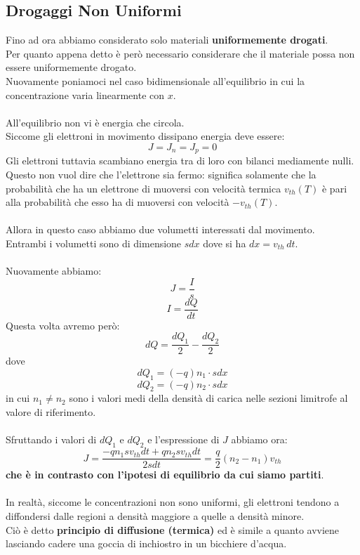 \documentclass{article}
\numberwithin{equation}{subsection}
\begin{document}
	\subsection{Drogaggi Non Uniformi}
	Fino ad ora abbiamo considerato solo materiali \textbf{uniformemente drogati}. \\
	Per quanto appena detto è però necessario considerare che il materiale possa non essere uniformemente drogato. \\
	Nuovamente poniamoci nel caso bidimensionale all’equilibrio in cui la concentrazione varia linearmente con $x$.\\\\
	All’equilibrio non vi è energia che circola. \\
	Siccome gli elettroni in movimento dissipano energia deve essere:
	$$J = J_n = J_p = 0$$
	Gli elettroni tuttavia scambiano energia tra di loro con bilanci mediamente nulli. \\
	Questo non vuol dire che l’elettrone sia fermo: significa solamente che la probabilità che ha un elettrone di muoversi con velocità termica $v_{th}(T)$ è pari alla probabilità che esso ha di muoversi con velocità $-v_{th}(T)$.\\\\
	Allora in questo caso abbiamo due volumetti interessati dal movimento. \\
	Entrambi i volumetti sono di dimensione $sdx$ dove si ha $dx = v_{th} \, dt$.\\\\
	Nuovamente abbiamo:
	$$J = \frac{I}{s}$$
	$$I = \frac{dQ}{dt}$$
	Questa volta avremo però:
	$$dQ = \frac{dQ_1}{2} - \frac{dQ_2}{2}$$
	dove
	$$dQ_1 = (-q) n_1 \cdot s dx$$
	$$dQ_2 = (-q) n_2 \cdot s dx$$
	in cui $n_1 \neq n_2$ sono i valori medi della densità di carica nelle sezioni limitrofe al valore di riferimento.\\\\
	Sfruttando i valori di $dQ_1$ e $dQ_2$ e l’espressione di $J$ abbiamo ora:
	$$J = \frac{-qn_1 sv_{th} dt + qn_2 sv_{th} dt}{2s dt} = \frac{q}{2}(n_2 - n_1)v_{th}$$
	\textbf{che è in contrasto con l’ipotesi di equilibrio da cui siamo partiti}.\\\\
	In realtà, siccome le concentrazioni non sono uniformi, gli elettroni tendono a diffondersi dalle regioni a densità maggiore a quelle a densità minore. \\
	Ciò è detto \textbf{principio di diffusione (termica)} ed è simile a quanto avviene lasciando cadere una goccia di inchiostro in un bicchiere d’acqua.\\\\
\end{document}
